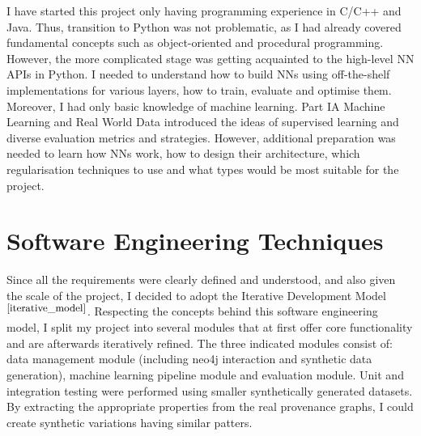 I have started this project only having programming experience in C/C++ and Java. Thus, transition to Python was not problematic, as I had already covered fundamental concepts such as object-oriented and procedural programming. However, the more complicated stage was getting acquainted to the high-level NN APIs in Python. I needed to understand how to build NNs using off-the-shelf implementations for various layers, how to train, evaluate and optimise them. Moreover, I had only basic knowledge of machine learning. Part IA Machine Learning and Real World Data introduced the ideas of supervised learning and diverse evaluation metrics and strategies. However, additional preparation was needed to learn how NNs work, how to design their architecture, which regularisation techniques to use and what types would be most suitable for the project. 

\section{Software Engineering Techniques}

Since all the requirements were clearly defined and understood, and also given the scale of the project, I decided to adopt the Iterative Development Model$^{\small \cite{iterative_model}}$. Respecting the concepts behind this software engineering model, I split my project into several modules that at first offer core functionality and are afterwards iteratively refined. The three indicated modules consist of: data management module (including neo4j interaction and synthetic data generation), machine learning pipeline module and evaluation module. Unit and integration testing were performed using smaller synthetically generated datasets. By extracting the appropriate properties from the real provenance graphs, I could create synthetic variations having similar patters. 



